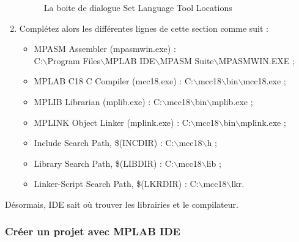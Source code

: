 \documentclass[a4paper]{article}
\begin{document}
\begin{enumerate}
\begin{figure}[H]
			\caption{La boite de dialogue \og{}Set Language Tool Locations\fg{}
				\label{Set_Language_Tool_Locations}}
		\end{figure}
	\item Complétez alors les différentes lignes de cette section comme suit :
		\begin{itemize}
			\item MPASM Assembler (mpasmwin.exe) :\\
			{\ttfamily C:$\backslash$Program Files$\backslash$MPLAB IDE$\backslash$MPASM Suite$\backslash$MPASMWIN.EXE} ;
			\item MPLAB C18 C Compiler (mcc18.exe) : {\ttfamily C:$\backslash$mcc18$\backslash$bin$\backslash$mcc18.exe} ;
			\item MPLIB Librarian (mplib.exe) : {\ttfamily C:$\backslash$mcc18$\backslash$bin$\backslash$mplib.exe} ;
			\item MPLINK Object Linker (mplink.exe) : {\ttfamily C:$\backslash$mcc18$\backslash$bin$\backslash$mplink.exe} ;
			\item Include Search Path, \$(INCDIR) : {\ttfamily C:$\backslash$mcc18$\backslash$h} ;
			\item Library Search Path, \$(LIBDIR) : {\ttfamily C:$\backslash$mcc18$\backslash$lib} ;
			\item Linker-Script Search Path, \$(LKRDIR) : {\ttfamily C:$\backslash$mcc18$\backslash$lkr}.
		\end{itemize}
\end{enumerate}

Désormais, \ac{IDE} sait où trouver les librairies et le compilateur.

\subsubsection{Créer un projet avec MPLAB IDE}
\end{document}
